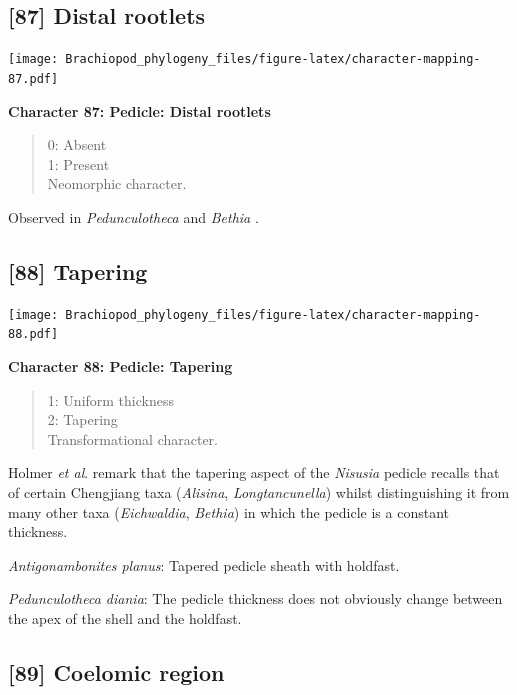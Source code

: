 \documentclass[openany]{book}
\theoremstyle{definition}
\theoremstyle{definition}
\theoremstyle{definition}
\theoremstyle{remark}
\begin{document}
\subsection*{{[}87{]} Distal rootlets}\label{distal-rootlets}

\texttt{[image: Brachiopod\_phylogeny\_files/figure-latex/character-mapping-87.pdf]}

\textbf{Character 87: Pedicle: Distal rootlets}

\begin{quote}
0: Absent\\
1: Present\\
Neomorphic character.
\end{quote}

Observed in \emph{Pedunculotheca} and \emph{Bethia}
\citep{Sutton2005Silurianbrachiopods}.

\subsection*{{[}88{]} Tapering}\label{tapering}

\texttt{[image: Brachiopod\_phylogeny\_files/figure-latex/character-mapping-88.pdf]}

\textbf{Character 88: Pedicle: Tapering}

\begin{quote}
1: Uniform thickness\\
2: Tapering\\
Transformational character.
\end{quote}

Holmer \emph{et al}. \citeyearpar{Holmer2018Theattachment} remark that
the tapering aspect of the \emph{Nisusia} pedicle recalls that of
certain Chengjiang taxa (\emph{Alisina}, \emph{Longtancunella}) whilst
distinguishing it from many other taxa (\emph{Eichwaldia},
\emph{Bethia}) in which the pedicle is a constant thickness.

\hypertarget{Antigonambonites_planus-coding-88}{}
\emph{Antigonambonites planus}: Tapered pedicle sheath with holdfast.

\hypertarget{Pedunculotheca_diania-coding-88}{}
\emph{Pedunculotheca diania}: The pedicle thickness does not obviously
change between the apex of the shell and the holdfast.

\subsection*{{[}89{]} Coelomic region}\label{coelomic-region}
\end{document}
